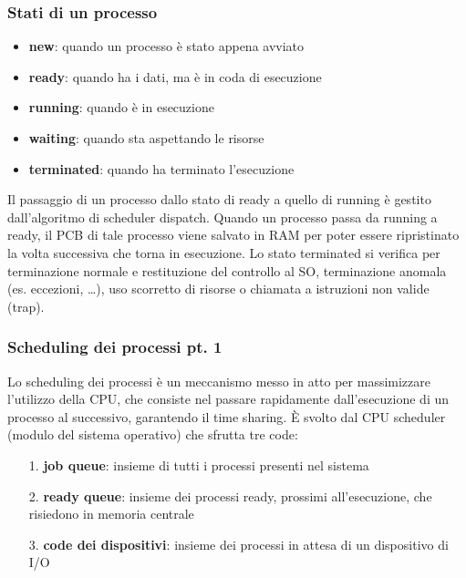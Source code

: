 \documentclass[a4paper]{article}
\begin{document}
\subsubsection*{Stati di un processo}
\begin{itemize}
	\item \textbf{new}: quando un processo è stato appena avviato
	\item \textbf{ready}: quando ha i dati, ma è in coda di esecuzione
	\item \textbf{running}: quando è in esecuzione
	\item \textbf{waiting}: quando sta aspettando le risorse
	\item \textbf{terminated}: quando ha terminato l'esecuzione
\end{itemize}
Il passaggio di un processo dallo stato di ready a quello di running è gestito dall'algoritmo di scheduler dispatch. Quando un
processo passa da running a ready, il PCB di tale processo viene salvato in RAM per poter essere ripristinato la volta successiva
che torna in esecuzione. Lo stato terminated si verifica per terminazione normale e restituzione del controllo al SO, terminazione
anomala (es. eccezioni, \dots), uso scorretto di risorse o chiamata a istruzioni non valide (trap).

\subsubsection*{Scheduling dei processi pt. 1}
Lo scheduling dei processi è un meccanismo messo in atto per massimizzare l’utilizzo della CPU, che consiste nel passare
rapidamente dall’esecuzione di un processo al successivo, garantendo il time sharing. È svolto dal CPU scheduler (modulo del
sistema operativo) che sfrutta tre code:
\begin{itemize}
	\item[1.] \textbf{job queue}: insieme di tutti i processi presenti nel sistema
	\item[2.] \textbf{ready queue}: insieme dei processi ready, prossimi all'esecuzione, che risiedono in memoria centrale
	\item[3.] \textbf{code dei dispositivi}: insieme dei processi in attesa di un dispositivo di I/O
\end{itemize}
\end{document}
